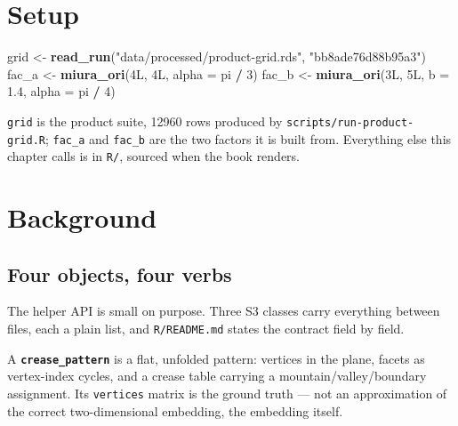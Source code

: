\documentclass[
  british,
  a4paper,
]{book}
\newenvironment{Shaded}{\begin{snugshade}}{\end{snugshade}}
\newcommand{\AttributeTok}[1]{\textcolor[rgb]{0.13,0.29,0.53}{#1}}
\newcommand{\DataTypeTok}[1]{\textcolor[rgb]{0.13,0.29,0.53}{#1}}
\newcommand{\DecValTok}[1]{\textcolor[rgb]{0.00,0.00,0.81}{#1}}
\newcommand{\FloatTok}[1]{\textcolor[rgb]{0.00,0.00,0.81}{#1}}
\newcommand{\FunctionTok}[1]{\textcolor[rgb]{0.13,0.29,0.53}{\textbf{#1}}}
\newcommand{\NormalTok}[1]{#1}
\newcommand{\OtherTok}[1]{\textcolor[rgb]{0.56,0.35,0.01}{#1}}
\newcommand{\SpecialCharTok}[1]{\textcolor[rgb]{0.81,0.36,0.00}{\textbf{#1}}}
\newcommand{\StringTok}[1]{\textcolor[rgb]{0.31,0.60,0.02}{#1}}
\begin{document}
\section{Setup}\label{bench-setup}

\begin{Shaded}
\begin{Highlighting}[]
\NormalTok{grid }\OtherTok{\textless{}{-}} \FunctionTok{read\_run}\NormalTok{(}\StringTok{"data/processed/product{-}grid.rds"}\NormalTok{, }\StringTok{"bb8ade76d88b95a3"}\NormalTok{)}
\NormalTok{fac\_a }\OtherTok{\textless{}{-}} \FunctionTok{miura\_ori}\NormalTok{(}\DecValTok{4}\DataTypeTok{L}\NormalTok{, }\DecValTok{4}\DataTypeTok{L}\NormalTok{, }\AttributeTok{alpha =}\NormalTok{ pi }\SpecialCharTok{/} \DecValTok{3}\NormalTok{)}
\NormalTok{fac\_b }\OtherTok{\textless{}{-}} \FunctionTok{miura\_ori}\NormalTok{(}\DecValTok{3}\DataTypeTok{L}\NormalTok{, }\DecValTok{5}\DataTypeTok{L}\NormalTok{, }\AttributeTok{b =} \FloatTok{1.4}\NormalTok{, }\AttributeTok{alpha =}\NormalTok{ pi }\SpecialCharTok{/} \DecValTok{4}\NormalTok{)}
\end{Highlighting}
\end{Shaded}

\texttt{grid} is the product suite, 12960 rows produced by
\texttt{scripts/run-product-grid.R}; \texttt{fac\_a} and \texttt{fac\_b} are the two factors it is
built from. Everything else this chapter calls is in \texttt{R/}, sourced when the book
renders.

\section{Background}\label{bench-background}

\subsection{Four objects, four verbs}\label{four-objects-four-verbs}

The helper API is small on purpose. Three S3 classes carry everything between
files, each a plain list, and \texttt{R/README.md} states the contract field by field.

A \textbf{\texttt{crease\_pattern}} is a flat, unfolded pattern: vertices in the plane,
facets as vertex-index cycles, and a crease table carrying a
mountain/valley/boundary assignment. Its \texttt{vertices} matrix is the ground truth ---
not an approximation of the correct two-dimensional embedding, the embedding
itself.
\end{document}
